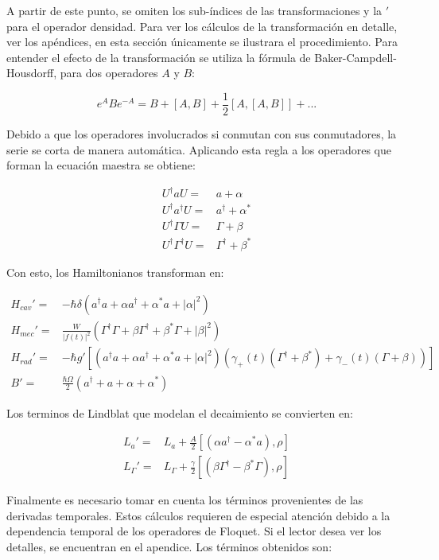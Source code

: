 \documentclass[a4paper,10pt]{report}
\begin{document}
A partir de este punto, se omiten los sub-índices de las transformaciones y la $'$ para el operador densidad. Para ver los cálculos de la transformación en detalle, ver los apéndices, en esta sección únicamente se ilustrara el procedimiento. Para entender el efecto de la transformación se utiliza la fórmula de Baker-Campdell-Housdorff\cite{SakuraiQM}, para dos operadores $A$ y $B$:

\begin{equation}
e^{A} B e^{-A} = B + [A,B] + \frac{1}{2}[A,[A,B]] + ...
\end{equation} 
 
Debido a que los operadores involucrados si conmutan con sus conmutadores, la serie se corta de manera automática. Aplicando esta regla a los operadores que forman la ecuación maestra se obtiene:

\begin{align}
U^{\dagger} a U =& a + \alpha \\
U^{\dagger} a^{\dagger} U =& a^{\dagger} + \alpha^* \\
U^{\dagger} \Gamma U =& \Gamma + \beta \\
U^{\dagger} \Gamma^{\dagger} U =& \Gamma^{\dagger} + \beta^* 
\end{align} 
 
Con esto, los Hamiltonianos transforman en:

\begin{align}
H_{cav}' =& -\hbar \delta(a^{\dagger}a +\alpha a^{\dagger}+\alpha^* a + |\alpha|^2)\\
H_{mec}' =& \frac{W}{|f(t)|^2}(\Gamma^{\dagger}\Gamma + \beta \Gamma^{\dagger} + \beta^* \Gamma + |\beta|^2 )\\
H_{rad}'=&-\hbar g'[(a^{\dagger}a +\alpha a^{\dagger}+\alpha^* a + |\alpha|^2)(\gamma_+(t)(\Gamma^{\dagger}+\beta^*)+\gamma_-(t)(\Gamma+\beta))]\\
B' =& \frac{\hbar \Omega}{2}(a^{\dagger} + a +\alpha + \alpha^*)
\end{align}

Los terminos de Lindblat que modelan el decaimiento se convierten en:

\begin{align}
L_a ' =& L_a + \frac{A}{2}[(\alpha a^\dagger - \alpha^*a),\rho] \\
L_{\Gamma}' =& L_{\Gamma} + \frac{\gamma}{2}[(\beta\Gamma^{\dagger}-\beta^* \Gamma),\rho]
\end{align}

Finalmente es necesario tomar en cuenta los términos provenientes de las derivadas temporales. Estos cálculos requieren de especial atención debido a la dependencia temporal de los operadores de Floquet. Si el lector desea ver los detalles, se encuentran en el apendice. Los términos obtenidos son:
\end{document}
